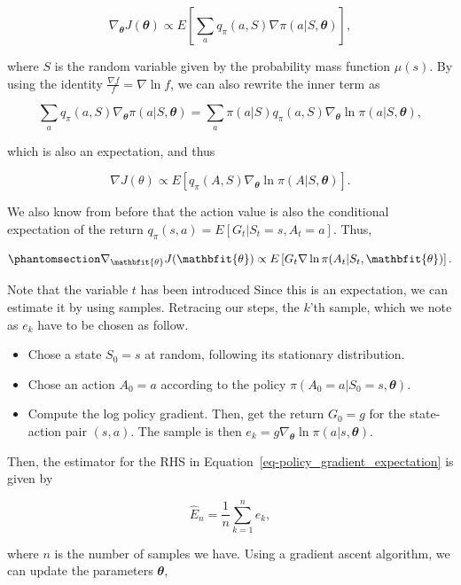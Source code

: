 \documentclass[
  letterpaper,
]{report}
\providecommand{\tightlist}{%
  \setlength{\itemsep}{0pt}\setlength{\parskip}{0pt}}\usepackage{longtable,booktabs,array}
\theoremstyle{definition}
\theoremstyle{plain}
\theoremstyle{definition}
\theoremstyle{remark}
\begin{document}
\[
\nabla_{\mathbfit{\theta}} J(\mathbfit{\theta}) \propto E\left[\sum_a q_\pi(a,S)\nabla \pi(a|S, \mathbfit{\theta})\right],
\]

where \(S\) is the random variable given by the probability mass
function \(\mu(s)\). By using the identity
\(\frac{\nabla f}{f} = \nabla \ln f\), we can also rewrite the inner
term as

\[
\sum_a q_\pi(a,S)\nabla_{\mathbfit{\theta}} \pi(a|S, {\mathbfit{\theta}}) = \sum_a \pi(a|S)q_\pi(a,S)\nabla_{\mathbfit{\theta}} \ln \pi(a|S, {\mathbfit{\theta}}),
\]

which is also an expectation, and thus

\[
\nabla J(\theta) \propto E\left[q_\pi(A,S)\nabla_{\mathbfit{\theta}} \ln \pi(A|S, {\mathbfit{\theta}})\right].
\]

We also know from before that the action value is also the conditional
expectation of the return \(q_\pi(s,a) = E[G_t|S_t = s, A_t = a]\).
Thus,

\begin{equation}\phantomsection\label{eq-policy_gradient_expectation}{
\nabla_{\mathbfit{\theta}} J({\mathbfit{\theta}}) \propto E\left[G_t\nabla \ln \pi(A_t|S_t, {\mathbfit{\theta}})\right].
}\end{equation}

Note that the variable \(t\) has been introduced Since this is an
expectation, we can estimate it by using samples. Retracing our steps,
the \(k\)'th sample, which we note as \(e_k\) have to be chosen as
follow.

\begin{itemize}
\tightlist
\item
  Chose a state \(S_0 = s\) at random, following its stationary
  distribution.
\item
  Chose an action \(A_0 = a\) according to the policy
  \(\pi(A_0 = a|S_0 = s, {\mathbfit{\theta}})\).
\item
  Compute the log policy gradient. Then, get the return \(G_0 = g\) for
  the state-action pair \((s,a)\). The sample is then
  \(e_k = g\nabla_{\mathbfit{\theta}} \ln \pi(a|s, {\mathbfit{\theta}})\).
\end{itemize}

Then, the estimator for the RHS in
Equation~\ref{eq-policy_gradient_expectation} is given by

\[
\hat{E}_n = \frac{1}{n}\sum_{k=1}^n e_k,
\]

where \(n\) is the number of samples we have. Using a gradient ascent
algorithm, we can update the parameters \(\mathbfit{\theta}\),
\end{document}
